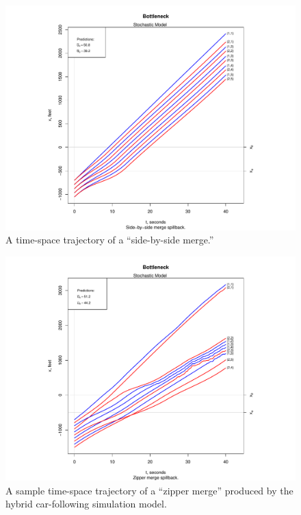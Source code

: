 \documentclass[Proceedings]{ascelike}
\begin{document}
\begin{figure}
\centering
\includegraphics[width = 5.5in]{Rplot04.pdf}
\caption{A time-space trajectory of a ``side-by-side merge.''}
\label{sbsmodel}
\end{figure}


\begin{figure}
\centering
\includegraphics[width = 5.5in]{Rplot09.pdf}
\caption{A sample time-space trajectory of a ``zipper merge'' produced by the hybrid car-following simulation model.}
\label{stochmodel}
\end{figure}
\end{document}

